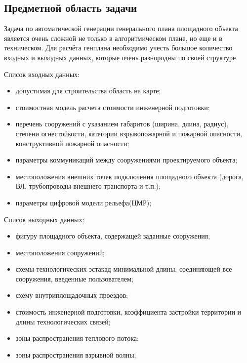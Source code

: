 \subsection*{\large{Предметной область задачи}}

Задача по автоматической генерации генерального плана площадного объекта является очень сложной не только
в алгоритмическом плане, но еще и в техническом. Для расчёта генплана необходимо учесть большое количество входных
и выходных данных, которые очень разнородны по своей структуре.

\noindent Список входных данных:
\begin{itemize}
    \item допустимая для строительства область на карте;
    \item стоимостная модель расчета стоимости инженерной подготовки;
    \item перечень сооружений с указанием габаритов (ширина, длина, радиус),
    степени огнестойкости, категории взрывопожарной и пожарной опасности, конструктивной пожарной опасности;
    \item параметры коммуникаций между сооружениями проектируемого объекта;
    \item местоположения внешних точек подключения площадного объекта (дорога, ВЛ, трубопроводы внешнего транспорта и т.п.);
    \item параметры цифровой модели рельефа(ЦМР);
\end{itemize}


\noindent Список выходных данных:
\begin{itemize}
    \item фигуру площадного объекта, содержащей заданные сооружения;
    \item местоположения сооружений;
    \item схемы технологических эстакад минимальной длины, соединяющей все сооружения, введенные пользователем;
    \item схему внутриплощадочных проездов;
    \item стоимость инженерной подготовки, коэффициента застройки территории и длины технологических связей;
    \item зоны распространения теплового потока;
    \item зоны распространения взрывной волны;
\end{itemize}
